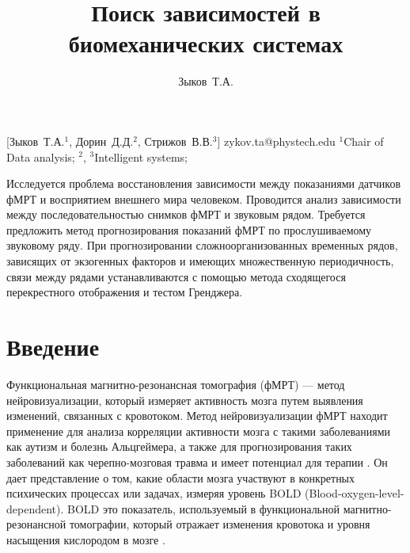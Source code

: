 \documentclass[12pt, twoside]{article}
\begin{document}
\title
    [Поиск зависимостей в биомеханических системах] %
    {Поиск зависимостей в биомеханических системах}
\author
    [Зыков Т.А.] %
    {Зыков~Т.А.} %
    [Зыков~Т.А.$^1$, Дорин~Д.Д.$^2$, Стрижов~В.В.$^{3}$] %
\email
    {zykov.ta@phystech.edu}
\organization
    {$^1$Chair of Data analysis; $^2$, $^3$Intelligent systems;}
\abstract
    {%

    
   Исследуется проблема восстановления зависимости между показаниями датчиков фМРТ и восприятием внешнего мира человеком. Проводится анализ зависимости между последовательностью снимков фМРТ и звуковым рядом. Требуется предложить метод прогнозирования показаний фМРТ по прослушиваемому звуковому ряду. При прогнозировании сложноорганизованных временных рядов, зависящих от экзогенных факторов и имеющих множественную периодичность, связи между рядами устанавливаются с помощью метода сходящегося перекрестного отображения и тестом Гренджера. 
}
\maketitle

\section{Введение}

Функциональная магнитно-резонансная томография (фМРТ) \citep{puras2014neurovisualization} — метод нейровизуализации, который измеряет активность мозга путем выявления изменений, связанных с кровотоком. Метод нейровизуализации фМРТ находит применение для анализа корреляции активности мозга с такими заболеваниями как аутизм и болезнь Альцгеймера, а также для прогнозирования таких заболеваний как черепно-мозговая травма и имеет потенциал для терапии \citep{fmriapplications}. Он дает представление о том, какие области мозга участвуют в конкретных психических процессах или задачах, измеряя уровень BOLD (Blood-oxygen-level-dependent). BOLD это показатель, используемый в функциональной магнитно-резонансной томографии, который отражает изменения кровотока и уровня насыщения кислородом в мозге \citep{bold}. 
\end{document}
